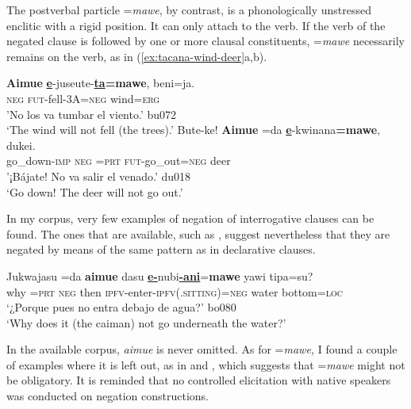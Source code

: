 \documentclass[output=paper]{langsci/langscibook}
\begin{document}
The postverbal particle =\textit{mawe}, by contrast, is a phonologically
unstressed enclitic with a rigid position. It can only attach to the verb.
If the verb of the negated clause is followed by one or more clausal
constituents, =\textit{mawe} necessarily remains on the verb, as in
(\ref{ex:tacana-wind-deer}a,b).

\begin{exe}\ex
\label{ex:tacana-wind-deer}      
\begin{xlist}
\ex\label{ex:tacana-wind}
\gll \textbf{Aimue} \textbf{\underline{e}}-juseute-\textbf{\underline{ta}=}\textbf{mawe}, beni=ja.\\
    \textsc{neg}  \textsc{fut}-fell-3A=\textsc{neg}  wind=\textsc{erg}\\
\glt 'No los va tumbar el viento.' bu072\\
`The wind will not fell (the trees).'
\ex\label{ex:tacana-deer}          
\gll  Bute-ke!  \textbf{Aimue}  =da \textbf{\underline{e}}-kwinana\textbf{=mawe}, dukei.\\
    go\_down-\textsc{imp}  \textsc{neg}  \textsc{=prt}
    \textsc{fut}-go\_out=\textsc{neg}  deer\\
\glt '¡Bájate! No va salir el venado.' du018\\
`Go down! The deer will not go out.'
\end{xlist}\end{exe}

In my corpus, very few examples of negation of interrogative clauses can be
found. The ones that are available, such as , suggest
nevertheless that they are negated by means of the same pattern as in declarative clauses.

\begin{exe}\ex
\label{ex:tacana-caiman}  
\gll Jukwajasu  =da  \textbf{aimue}  dasu
\textbf{\underline{e-}}nubi\textbf{\underline{-ani}}=\textbf{mawe} {\ob}yawi
tipa=su{\cb}?\\
 why  =\textsc{prt}  \textsc{neg}  then
 \textsc{ipfv}-enter-\textsc{ipfv(.sitting)}=\textsc{neg}  water
 bottom=\textsc{loc}\\
\glt `¿Porque pues no entra debajo de agua?' bo080\\
`Why does it (the caiman) not go underneath the water?' 
\end{exe}

In the available corpus, \textit{aimue} is never omitted. As for
=\textit{mawe,} I found a couple of examples where it is left out, as in
 and , which suggests
that =\textit{mawe} might not be obligatory. It is reminded that no
controlled elicitation with native speakers was conducted on negation
constructions.
\end{document}
